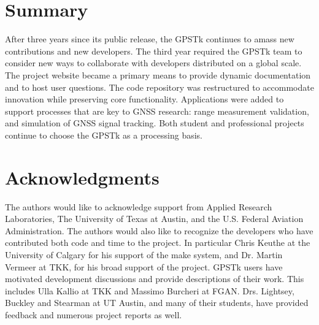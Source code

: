 \documentclass[letterpaper,ugly,10pt]{ion-gps}
\begin{document}
\section*{Summary}

After three years since its public release, the GPSTk continues to amass new contributions and new developers. The third year required the GPSTk team to consider new ways to collaborate with developers distributed on a global scale. The project website became a primary means to provide dynamic documentation and to host user questions. The code repository was restructured to accommodate innovation while preserving core functionality. Applications were added to support processes that are key to GNSS research: range measurement validation, and simulation of GNSS signal tracking. Both student and professional projects continue to choose the GPSTk as a processing basis.

\section*{Acknowledgments}

The authors would like to acknowledge support from Applied Research Laboratories, The University of Texas at Austin, and the U.S. Federal Aviation Administration. The authors would also like to recognize the developers who have contributed both code and time to the project. In particular Chris Keuthe at the University of Calgary for his support of the make system, and Dr. Martin Vermeer at TKK, for his broad support of the project. GPSTk users have motivated development discussions and provide descriptions of their work. This includes Ulla Kallio at TKK and Massimo Burcheri at FGAN. Drs. Lightsey, Buckley and Stearman at UT Austin, and many of their students, have provided feedback and numerous project reports as well.




\end{document}
